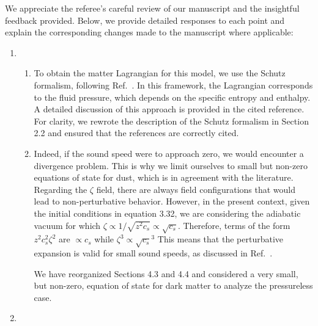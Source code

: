 \documentclass[a4paper,11pt]{article}
\begin{document}
We appreciate the referee's careful review of our manuscript and the insightful feedback
provided. Below, we provide detailed responses to each point and explain the
corresponding changes made to the manuscript where applicable:

\begin{enumerate}
      \item
            \begin{enumerate}
                  \item  To obtain the matter Lagrangian for this model, we use the Schutz
                        formalism, following Ref.~\cite{fluidgeral}. In this framework, the
                        Lagrangian corresponds to the fluid pressure, which depends on the
                        specific entropy and enthalpy. A detailed discussion of this
                        approach is provided in the cited reference. For clarity, we rewrote
                        the description of the Schutz formalism in Section 2.2 and ensured
                        that the references are correctly cited.

                  \item Indeed, if the sound speed were to approach zero, we would encounter
                        a divergence problem. This is why we limit ourselves to small but
                        non-zero equations of state for dust, which is in agreement with the
                        literature. Regarding the $\zeta$ field, there are always field
                        configurations that would lead to non-perturbative behavior.
                        However, in the present context, given the initial conditions in
                        equation 3.32, we are considering the adiabatic vacuum for which
                        $\zeta \propto 1/\sqrt{z^2c_s} \propto \sqrt{c_s}$. Therefore, terms
                        of the form $z^2c_s^2\zeta^2$ are $\propto c_s$ while $\zeta^3
                              \propto \sqrt{c_s}^3$ This means that the perturbative expansion is valid
                        for small sound speeds, as discussed in
                        Ref.~\cite{vitenti2012large}.

                        We have reorganized Sections 4.3 and 4.4 and considered a very
                        small, but non-zero, equation of state for dark matter to analyze
                        the pressureless case.
            \end{enumerate}

      \item


\end{enumerate}
\end{document}
